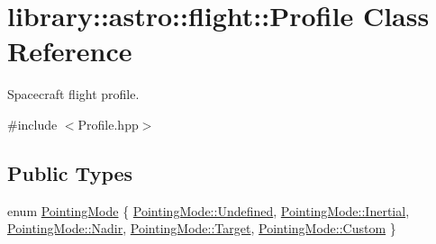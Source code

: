\hypertarget{classlibrary_1_1astro_1_1flight_1_1_profile}{}\section{library\+:\+:astro\+:\+:flight\+:\+:Profile Class Reference}
\label{classlibrary_1_1astro_1_1flight_1_1_profile}


Spacecraft flight profile.  




{\ttfamily \#include $<$Profile.\+hpp$>$}

\subsection*{Public Types}
\begin{DoxyCompactItemize}
\item 
enum \hyperlink{classlibrary_1_1astro_1_1flight_1_1_profile_a67798efdc3ae7a731d57c0ad053d1cae}{Pointing\+Mode} \{ \newline
\hyperlink{classlibrary_1_1astro_1_1flight_1_1_profile_a67798efdc3ae7a731d57c0ad053d1caeaec0fc0100c4fc1ce4eea230c3dc10360}{Pointing\+Mode\+::\+Undefined}, 
\hyperlink{classlibrary_1_1astro_1_1flight_1_1_profile_a67798efdc3ae7a731d57c0ad053d1caea4d5cc7bc19ef3d1ab992ba044dc0ebe4}{Pointing\+Mode\+::\+Inertial}, 
\hyperlink{classlibrary_1_1astro_1_1flight_1_1_profile_a67798efdc3ae7a731d57c0ad053d1caeae749bd0537284ea6e823e91c9edcb528}{Pointing\+Mode\+::\+Nadir}, 
\hyperlink{classlibrary_1_1astro_1_1flight_1_1_profile_a67798efdc3ae7a731d57c0ad053d1caeac41a31890959544c6523af684561abe5}{Pointing\+Mode\+::\+Target}, 
\newline
\hyperlink{classlibrary_1_1astro_1_1flight_1_1_profile_a67798efdc3ae7a731d57c0ad053d1caea90589c47f06eb971d548591f23c285af}{Pointing\+Mode\+::\+Custom}
 \}
\end{DoxyCompactItemize}
